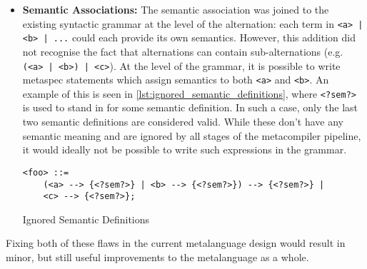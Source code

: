 \begin{itemize}
    \item \textbf{Semantic Associations:} The semantic association was joined to the existing syntactic grammar at the level of the alternation: each term in \texttt{<a> | <b> | ...} could each provide its own semantics.
    However, this addition did not recognise the fact that alternations can contain sub-alternations (e.g. \texttt{(<a> | <b>) | <c>}).
    At the level of the grammar, it is possible to write \gls{metaspec} statements which assign semantics to both \texttt{<a>} and \texttt{<b>}.
    An example of this is seen in \autoref{lst:ignored_semantic_definitions}, where \texttt{<?sem?>} is used to stand in for some semantic definition.
    In such a case, only the last two semantic definitions are considered valid. 
    While these don't have any semantic meaning and are ignored by all stages of the metacompiler pipeline, it would ideally not be possible to write such expressions in the grammar. 
\begin{listing}[!htb]
\begin{verbatim}
<foo> ::=   
    (<a> --> {<?sem?>} | <b> --> {<?sem?>}) --> {<?sem?>} | 
    <c> --> {<?sem?>};
\end{verbatim}
\caption{Ignored Semantic Definitions}
\label{lst:ignored_semantic_definitions}
\end{listing}
\end{itemize}

Fixing both of these flaws in the current metalanguage design would result in minor, but still useful improvements to the metalanguage as a whole. 


